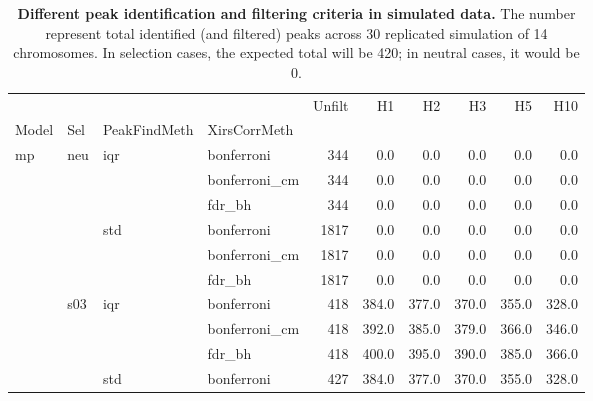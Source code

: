 \documentclass[11pt]{article}
\begin{document}
\begin{table}
	\center
	\caption{\textbf{Different peak identification and filtering criteria in simulated data.} The number represent
		total identified (and filtered) peaks across 30 replicated simulation of 14 chromosomes.
		In selection cases, the expected total will be 420; in neutral cases, it would be 0.
	}
	\begin{tabular}{llllrrrrrr}
		\hline
		\hline
		                        &                         &                         &                & Unfilt & H1    & H2    & H3    & H5    & H10   \\
		Model                   & Sel                     & PeakFindMeth            & XirsCorrMeth   &        &       &       &       &       &       \\
		\hline
		\multirow[t]{12}{*}{mp} & \multirow[t]{6}{*}{neu} & \multirow[t]{3}{*}{iqr} & bonferroni     & 344    & 0.0   & 0.0   & 0.0   & 0.0   & 0.0   \\
		                        &                         &                         & bonferroni\_cm & 344    & 0.0   & 0.0   & 0.0   & 0.0   & 0.0   \\
		                        &                         &                         & fdr\_bh        & 344    & 0.0   & 0.0   & 0.0   & 0.0   & 0.0   \\
		\cline{4-10}
		                        &                         & \multirow[t]{3}{*}{std} & bonferroni     & 1817   & 0.0   & 0.0   & 0.0   & 0.0   & 0.0   \\
		                        &                         &                         & bonferroni\_cm & 1817   & 0.0   & 0.0   & 0.0   & 0.0   & 0.0   \\
		                        &                         &                         & fdr\_bh        & 1817   & 0.0   & 0.0   & 0.0   & 0.0   & 0.0   \\
		\cline{4-10}
		                        & \multirow[t]{6}{*}{s03} & \multirow[t]{3}{*}{iqr} & bonferroni     & 418    & 384.0 & 377.0 & 370.0 & 355.0 & 328.0 \\
		                        &                         &                         & bonferroni\_cm & 418    & 392.0 & 385.0 & 379.0 & 366.0 & 346.0 \\
		                        &                         &                         & fdr\_bh        & 418    & 400.0 & 395.0 & 390.0 & 385.0 & 366.0 \\
		\cline{4-10}
		                        &                         & \multirow[t]{3}{*}{std} & bonferroni     & 427    & 384.0 & 377.0 & 370.0 & 355.0 & 328.0 \\

\end{tabular}
\end{table}
\end{document}
